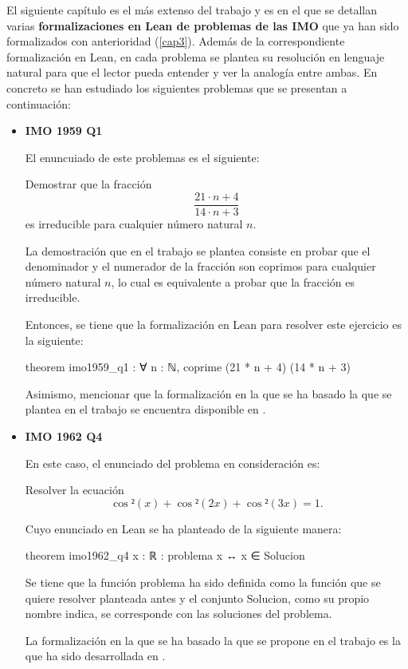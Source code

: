 El siguiente capítulo es el más extenso del trabajo y es en el que se
detallan varias \textbf{formalizaciones en Lean de problemas de las IMO}
que ya han sido formalizados con anterioridad (\ref{cap3}). Además de la
correspondiente formalización en Lean, en cada problema se plantea su
resolución en lenguaje natural para que el lector pueda entender y ver
la analogía entre ambas. En concreto se han estudiado los siguientes
problemas que se presentan a continuación:
\begin{itemize}
\item \textbf{IMO 1959 Q1}

  El enuncuiado de este problemas es el siguiente:

  Demostrar que la fracción
  \[\frac{21⋅n+4}{14⋅n+3}\]
  es irreducible para cualquier número natural \(n\).

  La demostración que en el trabajo se plantea consiste en probar que el
  denominador y el numerador de la fracción son coprimos para cualquier
  número natural \(n\), lo cual es equivalente a probar que la fracción es
  irreducible.

  Entonces, se tiene que la formalización en Lean para resolver este ejercicio
  es la siguiente:
  \begin{leancode}
  theorem imo1959_q1 : ∀ n : ℕ, coprime (21 * n + 4) (14 * n + 3) 
  \end{leancode}

  Asimismo, mencionar que la formalización en la que se ha basado la que se
  plantea en el trabajo se encuentra disponible en \cite{KL}.

\item \textbf{IMO 1962 Q4}

  En este caso, el enunciado del problema en consideración es:
  
  Resolver la ecuación
  \[\cos²(x)+\cos²(2x)+\cos²(3x)=1. \]

  Cuyo enunciado en Lean se ha planteado de la siguiente manera:

  \begin{leancode}
  theorem imo1962_q4
  {x : ℝ}
  : problema x ↔ x ∈ Solucion
  \end{leancode}

  Se tiene que la función problema ha sido definida como la función que se
  quiere resolver planteada antes y el conjunto Solucion, como su propio nombre
  indica, se corresponde con las soluciones del problema.
  
  La formalización en la que se ha basado la que se propone en el trabajo
  es la que ha sido desarrollada en \cite{KLHM}.


\end{itemize}
